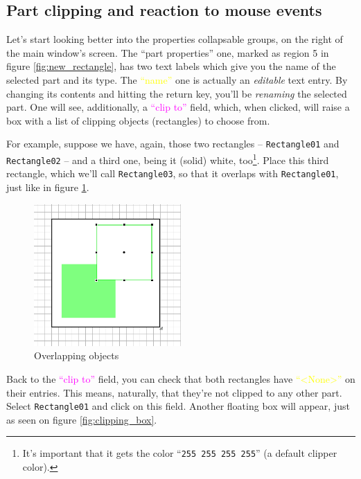 \documentclass[a4paper]{profusion}
\newcommand{\GUILabel}[1]{\textcolor{magenta}{#1}}
\newcommand{\GUIEditable}[1]{\textcolor{yellow}{#1}} %
\begin{document}
\subsection{Part clipping and reaction to mouse events}

Let's start looking better into the properties collapsable groups, on
the right of the main window's screen. The ``part properties'' one,
marked as region 5 in figure \ref{fig:new_rectangle}, has two text
labels which give you the name of the selected part and its type. The
\GUIEditable{``name''} one is actually an \emph{editable} text
entry. By changing its contents and hitting the return key, you'll be
\emph{renaming} the selected part. One will see, additionally, a
\GUILabel{``clip to''} field, which, when clicked, will raise a box
with a list of clipping objects (rectangles) to choose from.

For example, suppose we have, again, those two rectangles --
\texttt{Rectangle01} and \texttt{Rectangle02} -- and a third one,
being it (solid) white, too\footnote{ It's important that it gets the
  color ``\texttt{255 255 255 255}'' (a default clipper
  color).}. Place this third rectangle, which we'll call
\texttt{Rectangle03}, so that it overlaps with \texttt{Rectangle01},
just like in figure \ref{fig:overlap_white}.

\begin{figure}[h!]
  \centering
  \includegraphics[width=0.5\textwidth]{images/rectangle_overlap_white.png}
  \caption{Overlapping objects}
  \label{fig:overlap_white}
\end{figure}

Back to the \GUILabel{``clip to''} field, you can check that both
rectangles have \GUIEditable{``<None>''} on their entries. This means,
naturally, that they're not clipped to any other part. Select
\texttt{Rectangle01} and click on this field. Another floating box
will appear, just as seen on figure \ref{fig:clipping_box}.
\end{document}
